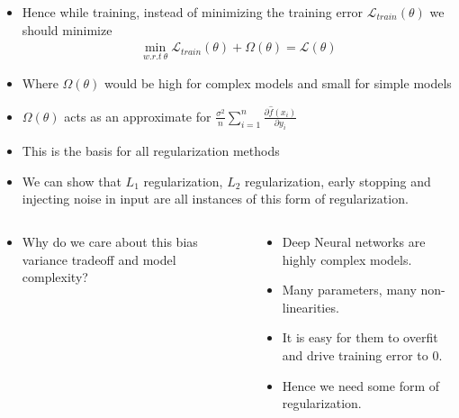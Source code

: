 \begin{frame}
	\begin{itemize}
		\justifying
		\setlength\itemsep{1em}
		\item<1->Hence while training, instead of minimizing the training error $\mathscr{L}_{train}(\theta)$ we should minimize
		\begin{align*}
			\min\limits_{w.r.t\ \theta} \mathscr{L}_{train}(\theta) + \Omega(\theta) = \mathscr{L}(\theta)
		\end{align*}
		\item<2->Where $\Omega(\theta)$ would be high for complex models and small for simple models
		\item<3->$\Omega(\theta)$ acts as an approximate for $\frac{\sigma^2}{n}\sum_{i=1}^{n}\frac{\partial\hat{f}(x_i)}{\partial y_i}$
		\item<4->This is the basis for all regularization methods
		\item<5->We can show that $L_1$ regularization, $L_2$ regularization, early stopping and injecting noise in input are all instances of this form of regularization.
	\end{itemize}
\end{frame}
\begin{frame}
	\centering
	
\end{frame}
		
\begin{frame}
	\begin{columns}
		\begin{overlayarea}{\textwidth}{\textheight}
			\justifying
			\begin{itemize}
				\item<1-> Why do we care about this bias variance tradeoff and model complexity?
			\end{itemize}

		\end{overlayarea}
		\begin{overlayarea}{\textwidth}{\textheight}
			\begin{itemize}
				\justifying
				\item<2->  Deep Neural networks are highly complex models.
				\item <3-> Many parameters, many non-linearities.
				\item <4-> It is easy for them to overfit and drive training error to 0.
				      \item<5->  Hence we need some form of regularization.
			\end{itemize}
		\end{overlayarea}
	\end{columns}
\end{frame}
		
